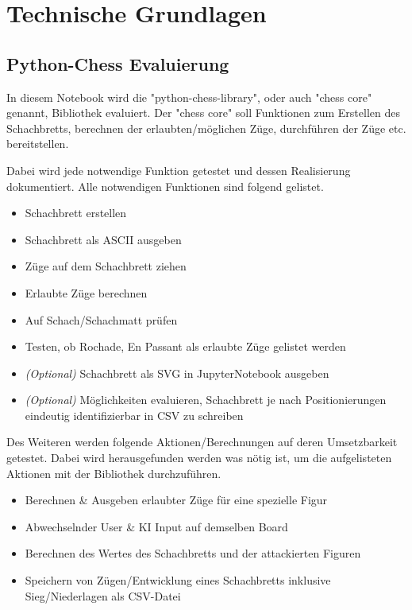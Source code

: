 
\chapter{Technische Grundlagen}


\section{Python-Chess Evaluierung}\label{python-chess-evaluierung}

In diesem Notebook wird die "python-chess-library", oder auch "chess
core" genannt, Bibliothek evaluiert. Der "chess core" soll Funktionen
zum Erstellen des Schachbretts, berechnen der erlaubten/möglichen Züge,
durchführen der Züge etc. bereitstellen.

Dabei wird jede notwendige Funktion getestet und dessen Realisierung
dokumentiert. Alle notwendigen Funktionen sind folgend gelistet.

\begin{itemize}
\tightlist
\item
  Schachbrett erstellen
\item
  Schachbrett als ASCII ausgeben
\item
  Züge auf dem Schachbrett ziehen
\item
  Erlaubte Züge berechnen
\item
  Auf Schach/Schachmatt prüfen
\item
  Testen, ob Rochade, En Passant als erlaubte Züge gelistet werden
\item
  \emph{(Optional)} Schachbrett als SVG in JupyterNotebook ausgeben
\item
  \emph{(Optional)} Möglichkeiten evaluieren, Schachbrett je nach
  Positionierungen eindeutig identifizierbar in CSV zu schreiben
\end{itemize}

Des Weiteren werden folgende Aktionen/Berechnungen auf deren
Umsetzbarkeit getestet. Dabei wird herausgefunden werden was nötig ist,
um die aufgelisteten Aktionen mit der Bibliothek durchzuführen.

\begin{itemize}
\tightlist
\item
  Berechnen \& Ausgeben erlaubter Züge für eine spezielle Figur
\item
  Abwechselnder User \& KI Input auf demselben Board
\item
  Berechnen des Wertes des Schachbretts und der attackierten Figuren
\item
  Speichern von Zügen/Entwicklung eines Schachbretts inklusive
  Sieg/Niederlagen als CSV-Datei
\end{itemize}

